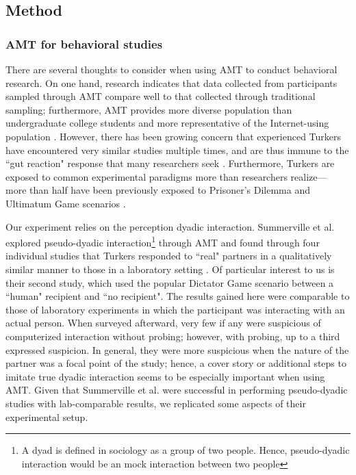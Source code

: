 \documentclass{sig-alternate}
\begin{document}
\subsection{Method}
\subsubsection{AMT for behavioral studies} 
There are several thoughts to consider when using AMT to conduct behavioral research. On one hand, research indicates that data collected from participants sampled through AMT compare well to that collected through traditional sampling; furthermore, AMT provides more diverse population than undergraduate college students and more representative of the Internet-using population \cite{crump2013evaluating} \cite{mason2012conducting}. However, there has been growing concern that experienced Turkers have encountered very similar studies multiple times, and are thus immune to the ``gut reaction" response that many researchers seek \cite{chandler2014nonnaivete}. Furthermore, Turkers are exposed to common experimental paradigms more than researchers realize--- more than half have been previously exposed to Prisoner's Dilemma and Ultimatum Game scenarios \cite{chandler2014nonnaivete}.

Our experiment relies on the perception dyadic interaction. Summerville et al. explored pseudo-dyadic interaction\footnote{A dyad is defined in sociology as a group of two people. Hence, pseudo-dyadic interaction would be an mock interaction between two people} through AMT and found through four individual studies that Turkers responded to ``real" partners in a qualitatively similar manner to those in a laboratory setting \cite{summerville2013pseudo}. Of particular interest to us is their second study, which used the popular Dictator Game scenario between a ``human" recipient and ``no recipient". The results gained here were comparable to those of laboratory experiments in which the participant was interacting with an actual person. When surveyed afterward, very few if any were suspicious of computerized interaction without probing; however, with probing, up to a third expressed suspicion. In general, they were more suspicious when the nature of the partner was a focal point of the study; hence, a cover story or additional steps to imitate true dyadic interaction seems to be especially important when using AMT. Given that Summerville et al. were successful in performing pseudo-dyadic studies with lab-comparable results, we replicated some aspects of their experimental setup.
\end{document}
